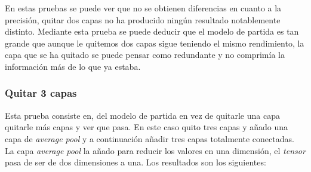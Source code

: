 \documentclass[12pt,a4paper]{article}
\begin{document}
\begin{table}[H]
\centering
{}
\caption{Resultados quitar 2 capas.}
\end{table}

En estas pruebas se puede ver que no se obtienen diferencias en cuanto a la precisión, quitar dos capas no ha producido ningún resultado notablemente distinto. Mediante esta prueba se puede deducir que el modelo de partida es tan grande que aunque le quitemos dos capas sigue teniendo el mismo rendimiento, la capa que se ha quitado se puede pensar como redundante y no comprimía la información más de lo que ya estaba.

\subsubsection{Quitar 3 capas}
Esta prueba consiste en, del modelo de partida en vez de quitarle una capa quitarle más capas y ver que pasa. En este caso quito tres capas y añado una capa de \textit{average pool} y a continuación añadir tres capas totalmente conectadas. La capa \textit{average pool} la añado para reducir los valores en una dimensión, el \textit{tensor} pasa de ser de dos dimensiones a una. Los resultados son los siguientes:
\end{document}
